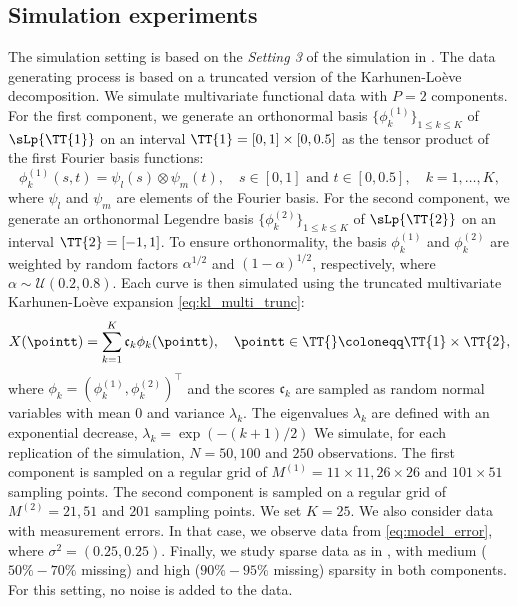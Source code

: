 \subsection{Simulation experiments} %
\label{sub:simulation_experiments}

The simulation setting is based on the \emph{Setting 3} of the simulation in \cite{happMultivariateFunctionalPrincipal2018a}.
The data generating process is based on a truncated version of the Karhunen-Loève decomposition. We simulate multivariate functional data with $P = 2$ components. For the first component, we generate an orthonormal basis $\{\phi^{(1)}_k\}_{1 \leq k \leq K}$ of $\sLp{\TT{1}}$ on an interval $\TT{1} = [0, 1] \times [0, 0.5]$ as the tensor product of the first Fourier basis functions:
\begin{equation}
    \phi^{(1)}_k(s, t) = \psi_l(s) \otimes \psi_m(t), \quad s \in [0, 1] \text{ and } t \in [0, 0.5],\quad k = 1, \dots, K,
\end{equation}
where $\psi_l$ and $\psi_m$ are elements of the Fourier basis. For the second component, we generate an orthonormal Legendre basis $\{\phi^{(2)}_k\}_{1 \leq k \leq K}$ of $\sLp{\TT{2}}$ on an interval $\TT{2} = [-1, 1]$. To ensure orthonormality, the basis $\phi^{(1)}_k$ and $\phi^{(2)}_k$ are weighted by random factors $\alpha^{1/2}$ and $(1 - \alpha)^{1/2}$, respectively, where $\alpha \sim \mathcal{U}(0.2, 0.8)$.
Each curve is then simulated using the truncated multivariate Karhunen-Loève expansion \eqref{eq:kl_multi_trunc}:
\begin{equation}
    X(\pointt) = \sum_{k = 1}^K \mathfrak{c}_k \phi_k(\pointt), \quad \pointt \in \TT{} \coloneqq \TT{1} \times \TT{2},
\end{equation}
where $\phi_k = (\phi^{(1)}_k, \phi^{(2)}_k)^\top$ and the scores $\mathfrak{c}_k$ are sampled as random normal variables with mean $0$ and variance $\lambda_k$. The eigenvalues $\lambda_k$ are defined with an exponential decrease, $\lambda_k = \exp(-(k + 1)/2)$ We simulate, for each replication of the simulation, $N = 50, 100$ and $250$ observations. The first component is sampled on a regular grid of $M^{(1)} = 11 \times 11, 26 \times 26$ and $101 \times 51$ sampling points. The second component is sampled on a regular grid of $M^{(2)} = 21, 51$ and $201$ sampling points. We set $K = 25$.
We also consider data with measurement errors. In that case, we observe data from \eqref{eq:model_error}, where $\sigma^2 = (0.25, 0.25)$. Finally, we study sparse data as in \cite{happMultivariateFunctionalPrincipal2018a}, with medium ($50\%-70\%$ missing) and high ($90\%-95\%$ missing) sparsity in both components. For this setting, no noise is added to the data.

